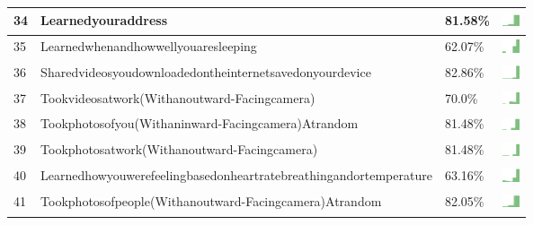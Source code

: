 \documentclass[a4paper,12pt]{article}
\begin{document}
\begin{longtable}{| p{0.5cm} | p{7cm} | p{1cm} | c |}
34 & Learnedyouraddress & 81.58\% & \includegraphics[width = 0.5cm, height = 0.5cm]{learnedyouraddressWORKCONTACTS} \\ \hline 
35 & Learnedwhenandhowwellyouaresleeping & 62.07\% & \includegraphics[width = 0.5cm, height = 0.5cm]{learnedwhenandhowwellyouaresleepingWORKCONTACTS} \\ \hline 
36 & Sharedvideosyoudownloadedontheinternetsavedonyourdevice & 82.86\% & \includegraphics[width = 0.5cm, height = 0.5cm]{sharedvideosyoudownloadedontheinternetsavedonyourdeviceWORKCONTACTS} \\ \hline 
37 & Tookvideosatwork(Withanoutward-Facingcamera) & 70.0\% & \includegraphics[width = 0.5cm, height = 0.5cm]{tookvideosatwork(withanoutward-facingcamera)WORKCONTACTS} \\ \hline 
38 & Tookphotosofyou(Withaninward-Facingcamera)Atrandom & 81.48\% & \includegraphics[width = 0.5cm, height = 0.5cm]{tookphotosofyou(withaninward-facingcamera)atrandomWORKCONTACTS} \\ \hline 
39 & Tookphotosatwork(Withanoutward-Facingcamera) & 81.48\% & \includegraphics[width = 0.5cm, height = 0.5cm]{tookphotosatwork(withanoutward-facingcamera)WORKCONTACTS} \\ \hline 
40 & Learnedhowyouwerefeelingbasedonheartratebreathingandortemperature & 63.16\% & \includegraphics[width = 0.5cm, height = 0.5cm]{learnedhowyouwerefeelingbasedonheartratebreathingandortemperatureWORKCONTACTS} \\ \hline 
41 & Tookphotosofpeople(Withanoutward-Facingcamera)Atrandom & 82.05\% & \includegraphics[width = 0.5cm, height = 0.5cm]{tookphotosofpeople(withanoutward-facingcamera)atrandomWORKCONTACTS} \\ \hline 

\end{longtable}
\end{document}
